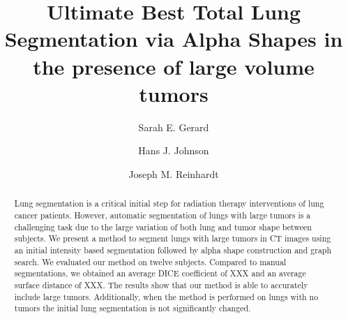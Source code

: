 \documentclass{llncs}
\begin{document}
%
\frontmatter          %
%
\pagestyle{headings}  %
%

%
\tableofcontents
%
\listoftodos

\mainmatter              %
%
\title{Ultimate Best Total Lung Segmentation via Alpha Shapes in the presence of large volume tumors}
%
%
\author{Sarah E. Gerard \and Hans J. Johnson
\and Joseph M. Reinhardt}
%
%
%


\maketitle              %

\begin{abstract}
Lung segmentation is a critical initial step for radiation therapy interventions of lung cancer patients. However, automatic segmentation of lungs with large tumors is a challenging task due to the large variation of both lung and tumor shape between subjects. We present a method to segment lungs with large tumors in CT images using an initial intensity based segmentation followed by alpha shape construction and graph search. We evaluated our method on twelve subjects. Compared to manual segmentations, we obtained an average DICE coefficient of XXX and an average surface distance of XXX. The results show that our method is able to accurately include large tumors. Additionally, when the method is performed on lungs with no tumors the initial lung segmentation is not significantly changed. 

\end{abstract}
%
\end{document}
